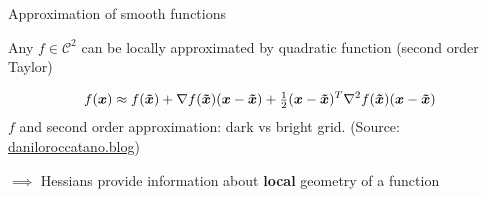 \documentclass[11pt,compress,t,notes=noshow, xcolor=table]{beamer}
\begin{document}
\begin{framei}{Approximation of smooth functions}
\item Any $f \in \mathcal{C}^2$ can be locally approximated by quadratic function (second order Taylor)
\item[] \begin{equation*}
f(\bm{x}) \approx f(\bm{\tilde{x}}) + \nabla f(\bm{\tilde{x}})(\bm{x}-\bm{\tilde{x}}) + \tfrac 12(\bm{x}-\bm{\tilde{x}})^T\nabla^2 f(\bm{\tilde{x}})(\bm{x}-\bm{\tilde{x}})
\end{equation*}
{\footnotesize $f$ and second order approximation: dark vs bright grid. (Source: \url{daniloroccatano.blog})}
\item $\implies$ Hessians provide information about \textbf{local} geometry of a function
\end{framei}
  
\endlecture
\end{document}
